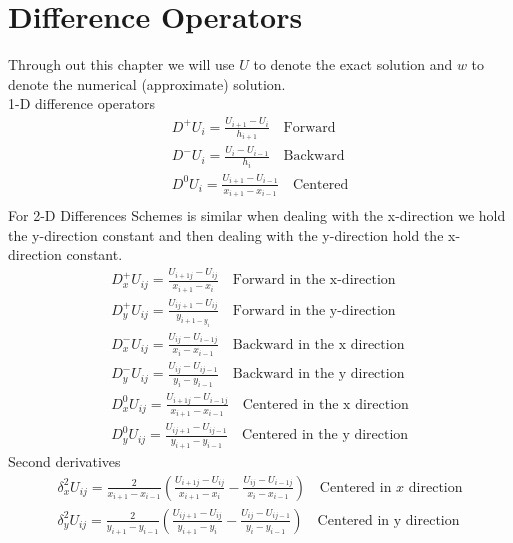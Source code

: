 \chapter{Difference Operators}
Through out this chapter we will use $U$ to denote the exact solution and 
$w$ to denote the numerical (approximate) solution.\\
1-D difference operators
\begin{eqnarray*}
D^{+}U_{i}=\frac{U_{i+1}-U_{i}}{h_{i+1}} \ \ \ \mbox{ Forward} \\
D^{-}U_{i}=\frac{U_{i}-U_{i-1}}{h_i} \ \ \ \mbox{ Backward} \\
D^{0}U_{i}=\frac{U_{i+1}-U_{i-1}}{x_{i+1}-x_{i-1}} \ \ \ \mbox{ Centered} \\
\end{eqnarray*}
For 2-D Differences Schemes is similar when dealing with the x-direction we hold
the y-direction constant and then dealing with the y-direction hold the x-direction
constant.
\begin{eqnarray*}
D^{+}_xU_{ij}=\frac{U_{i+1j}-U_{ij}}{x_{i+1}-x_{i}} \ \ \ \mbox{ Forward in the x-direction} \\
D^{+}_yU_{ij}=\frac{U_{ij+1}-U_{ij}}{y_{i+1-y_{i}}} \ \ \ \mbox{ Forward in the y-direction} \\
D^{-}_xU_{ij}=\frac{U_{ij}-U_{i-1j}}{x_i-x_{i-1}} \ \ \ \mbox{ Backward in the x direction} \\
D^{-}_yU_{ij}=\frac{U_{ij}-U_{ij-1}}{y_i-y_{i-1}} \ \ \ \mbox{ Backward in the y direction} \\
D^{0}_xU_{ij}=\frac{U_{i+1j}-U_{i-1j}}{x_{i+1}-x_{i-1}} \ \ \ \mbox{ Centered in the x direction} \\
D^{0}_yU_{ij}=\frac{U_{ij+1}-U_{ij-1}}{y_{i+1}-y_{i-1}} \ \ \ \mbox{ Centered in the y direction} 
\end{eqnarray*}
Second derivatives
\begin{eqnarray*}
\delta_x^{2}U_{ij}=\frac{2}{x_{i+1}-x_{i-1}}\left(\frac{U_{i+1j}-U_{ij}}{x_{i+1}-x_{i}}-\frac{U_{ij}-U_{i-1j}}{x_{i}-x_{i-1}}\right) \ \ \ \mbox{ Centered in $x$ direction} \\
\delta_y^{2}U_{ij}=\frac{2}{y_{i+1}-y_{i-1}}\left(\frac{U_{ij+1}-U_{ij}}{y_{i+1}-y_{i}}-\frac{U_{ij}-U_{ij-1}}{y_{i}-y_{i-1}}\right) \ \ \ \mbox{ Centered in y direction} \\
\end{eqnarray*}

